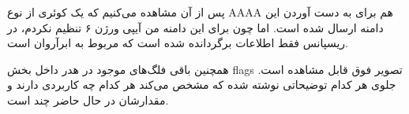 {
}


پس از آن مشاهده می‌کنیم که یک کوئری از نوع AAAA هم برای به دست آوردن 
این دامنه ارسال شده است. اما چون برای این دامنه من آیپی ورژن ۶ تنظیم نکردم، در ریسپانس فقط اطلاعات 
برگردانده شده است که مربوط به ابرآروان است.



همچنین باقی فلگ‌های موجود در هدر داخل بخش flags تصویر فوق قابل مشاهده است. جلوی هر کدام توضیحاتی نوشته شده که مشخص می‌کند هر کدام چه کاربردی دارند و مقدارشان در حال حاضر چند است.



